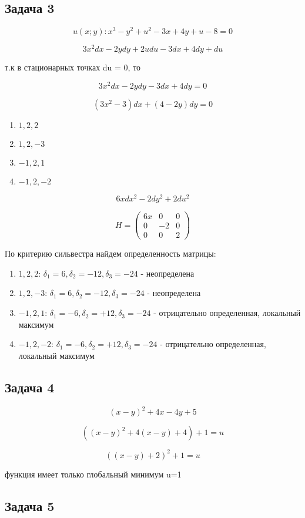 \documentclass[a4paper,12pt]{article}
\begin{document}
\subsection{Задача 3}
\[
u(x;y): x^3-y^2+u^2-3x+4y+u-8=0
\]

\[
3x^2dx-2ydy+2udu-3dx+4dy+du
\]

т.к в стационарных точках du = 0, то

\[
3x^2dx-2ydy-3dx+4dy = 0
\]

\[
(3x^2-3)dx + (4-2y)dy = 0
\]

\begin{enumerate}
	\item $1, 2, 2$
	\item $1, 2, -3$
	\item $-1, 2, 1$
	\item $-1, 2, -2$
\end{enumerate}

\[
6xdx^2-2dy^2+2du^2
\]

\[
H = 
\begin{pmatrix}
	6x & 0 & 0 \\
	0 & -2 & 0 \\
	0 & 0 & 2
\end{pmatrix}
\]

По критерию сильвестра найдем определенность матрицы: 

\begin{enumerate}
	\item $1, 2, 2$: $\delta_1 = 6, \delta_2 = -12, \delta_3 = -24$ - неопределена
	\item $1, 2, -3$: $\delta_1 = 6, \delta_2 = -12, \delta_3 = -24$ - неопределена
	\item $-1, 2, 1$: $\delta_1 = -6, \delta_2 = +12, \delta_3 = -24$ - отрицательно определенная, локальный максимум
	\item $-1, 2, -2$: $\delta_1 = -6, \delta_2 = +12, \delta_3 = -24$ - отрицательно определенная, локальный максимум
\end{enumerate}

\subsection{Задача 4}
\[
(x-y)^2+4x-4y+5
\]

\[
((x-y)^2+4(x-y)+4)+1 = u
\]

\[
((x-y)+2)^2+1 = u
\]

функция имеет только глобальный минимум u=1

\subsection{Задача 5}
\end{document}
